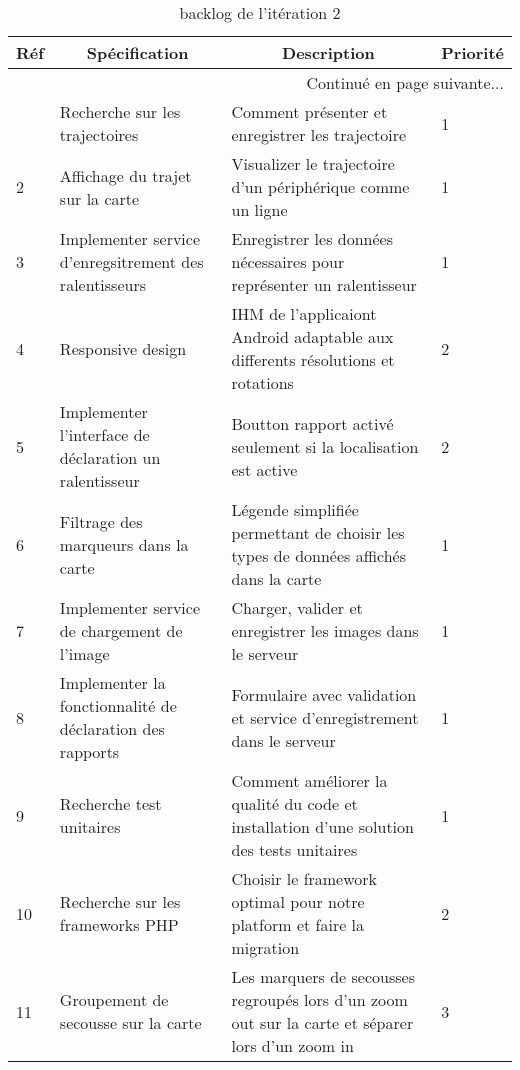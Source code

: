 \begin{center}
    \footnotesize
    \begin{longtable}{| p{1cm} | p{5cm} | p{7cm} | p{1cm} |}
        \caption{backlog de l'itération 2}
        \label{tab:sprint2-backlog} \\

        \hline
        \multicolumn{1}{|c}{\textbf{Réf}} &
        \multicolumn{1}{|c}{\textbf{Spécification}} &
        \multicolumn{1}{|c}{\textbf{Description}} &
        \multicolumn{1}{|c|}{\textbf{Priorité}} \\ \hline
        \endhead

        \hline \multicolumn{4}{|r|}{{Continué en page suivante$\dotsc$}} \\ \hline
        \endfoot

        \hline \hline
        \endlastfoot

        \hline
1 & Recherche sur les trajectoires & Comment présenter et enregistrer les trajectoire & 1 \\ \hline
2 & Affichage du trajet sur la carte & Visualizer le trajectoire d'un périphérique comme un ligne & 1 \\ \hline
3 & Implementer service d'enregsitrement des ralentisseurs & Enregistrer les données nécessaires pour représenter un ralentisseur & 1 \\ \hline
4 & Responsive design & IHM de l'applicaiont Android adaptable aux differents résolutions et rotations & 2 \\ \hline
5 & Implementer l'interface de déclaration un ralentisseur & Boutton rapport activé seulement si la localisation est active & 2 \\ \hline
6 & Filtrage des marqueurs dans la carte & Légende simplifiée permettant de choisir les types de données affichés dans la carte & 1 \\ \hline
7 & Implementer service de chargement de l'image & Charger, valider et enregistrer les images dans le serveur & 1 \\ \hline
8 & Implementer la fonctionnalité de déclaration des rapports & Formulaire avec validation et service d'enregistrement dans le serveur & 1 \\ \hline
9 & Recherche test unitaires & Comment améliorer la qualité du code et installation d'une solution des tests unitaires & 1 \\ \hline
10 & Recherche sur les frameworks PHP & Choisir le framework optimal pour notre platform et faire la migration & 2 \\ \hline
11 & Groupement de secousse sur la carte & Les marquers de secousses regroupés lors d'un zoom out sur la carte et séparer lors d'un zoom in & 3 \\ \hline
    \end{longtable}
\end{center}

